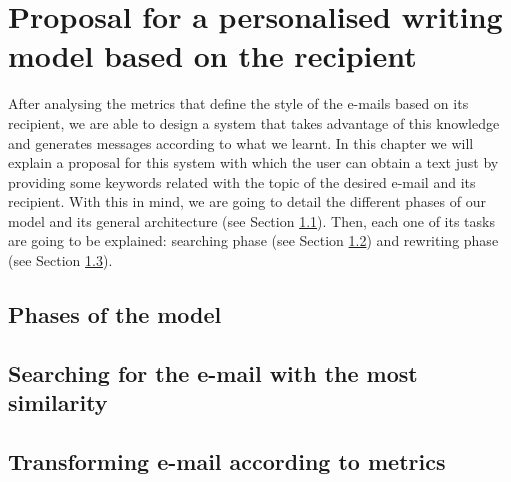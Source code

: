 \chapter{Proposal for a personalised writing model based on the recipient}\label{cap:proposal}


After analysing the metrics that define the style of the e-mails based on its recipient, we are able to design a system that takes advantage of this knowledge and generates messages according to what we learnt. In this chapter we will explain a proposal for this system with which the user can obtain a text just by providing some keywords related with the topic of the desired e-mail and its recipient. With this in mind, we are going to detail the different phases of our model and its general architecture (see Section \ref{sect:phasemod}). Then, each one of its tasks are going to be explained: searching phase (see Section \ref{sect:searchemail}) and rewriting phase (see Section \ref{sect:transemail}).

\section{Phases of the model}\label{sect:phasemod}


\section{Searching for the e-mail with the most similarity}\label{sect:searchemail}


\section{Transforming e-mail according to metrics}\label{sect:transemail}
